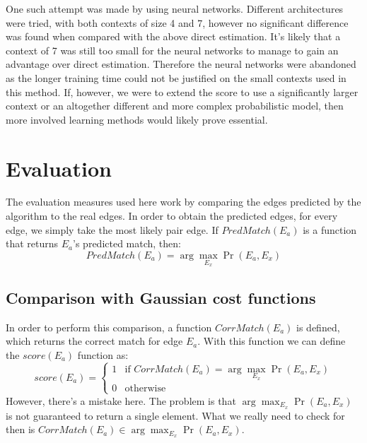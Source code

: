 One such attempt was made by using neural networks. Different architectures were tried, with both contexts of size 4 and 7, however no significant difference was found when compared with the above direct estimation. It's likely that a context of 7 was still too small for the neural networks to manage to gain an advantage over direct estimation. Therefore the neural networks were abandoned as the longer training time could not be justified on the small contexts used in this method. If, however, we were to extend the score to use a significantly larger context or an altogether different and more complex probabilistic model, then more involved learning methods would likely prove essential. 

\section{Evaluation}
\label{chap4Eval}
The evaluation measures used here work by comparing the edges predicted by the algorithm to the real edges. In order to obtain the predicted edges, for every edge, we simply take the most likely pair edge. If \(PredMatch(E_a)\) is a function that returns \(E_a\)'s predicted match, then:
\[PredMatch(E_a) = \arg\max_{E_x} \Pr(E_a,E_x) \]

\subsection{Comparison with Gaussian cost functions}
In order to perform this comparison, a function \(CorrMatch(E_a)\) is defined, which returns the correct match for edge $E_a$. With this function we can define the \(score(E_a)\) function as:
\[
score(E_a) =
\left\{
	\begin{array}{ll}
		1  & \mbox{if } CorrMatch(E_a) = \arg\max_{E_x} \Pr(E_a,E_x) \\
		0 & \mbox{otherwise } 
	\end{array}
\right.
\]
However, there's a mistake here. The problem is that \(\arg\max_{E_x} \Pr(E_a,E_x)\) is not guaranteed to return a single element. What we really need to check for then is \( CorrMatch(E_a) \in \arg\max_{E_x} \Pr(E_a,E_x) \). 


